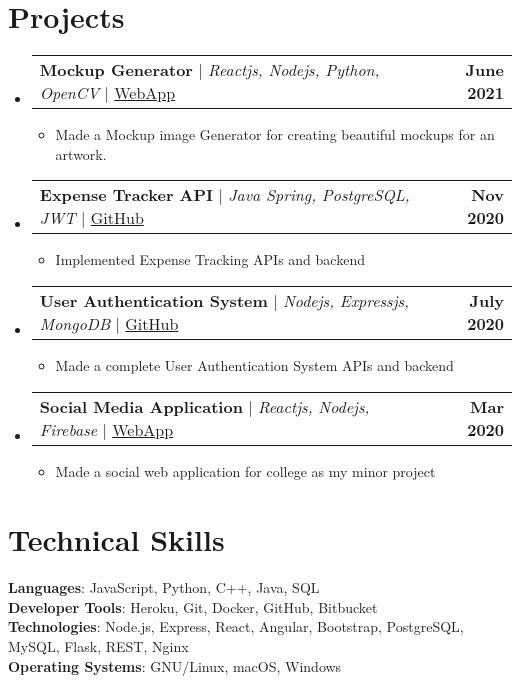 \documentclass[letterpaper,11pt]{article}
\makeatletter
\newcommand{\resumeItem}[1]{
  \item\small{
    {#1 \vspace{-2pt}}
  }
}
\newcommand{\resumeProjectHeading}[2]{
    \item
    \begin{tabular*}{1.001\textwidth}{l@{\extracolsep{\fill}}r}
      \small#1 & \textbf{\small #2} \\
    \end{tabular*}\vspace{-7pt}
}
\newcommand{\resumeSubHeadingListStart}{\begin{itemize}[leftmargin=0.0in, label={}]}
\newcommand{\resumeSubHeadingListEnd}{\end{itemize}}
\newcommand{\resumeItemListStart}{\justify \begin{itemize}}
\newcommand{\resumeItemListEnd}{\end{itemize}\vspace{-5pt}}
\makeatother
\begin{document}
\section{Projects}
    \vspace{-5pt}
    \resumeSubHeadingListStart
        \resumeProjectHeading
            {\textbf{Mockup Generator} $|$ \emph{Reactjs, Nodejs, Python, OpenCV}  $|$ \href{http://mockupgenerator-12159.web.app}{WebApp}}{June 2021}
            \resumeItemListStart
                \resumeItem{Made a Mockup image Generator for creating beautiful mockups for an artwork.}
            \resumeItemListEnd
        \resumeProjectHeading
            {\textbf{Expense Tracker API} $|$ \emph{Java Spring, PostgreSQL, JWT} $|$ \href{https://github.com/owais1412/expense-tracker-api}{GitHub}}{Nov 2020}
            \resumeItemListStart
                \resumeItem{Implemented Expense Tracking APIs and backend}
            \resumeItemListEnd
        \resumeProjectHeading
            {\textbf{User Authentication System} $|$ \emph{Nodejs, Expressjs, MongoDB} $|$ \href{https://github.com/owais1412/Node-User-Auth}{GitHub}}{July 2020}
            \resumeItemListStart
                \resumeItem{Made a complete User Authentication System APIs and backend}
            \resumeItemListEnd
        \resumeProjectHeading
            {\textbf{Social Media Application} $|$ \emph{Reactjs, Nodejs, Firebase} $|$ \href{https://svcesocialspace.web.app/login}{WebApp}}{Mar 2020}
            \resumeItemListStart
                \resumeItem{Made a social web application for college as my minor project}
            \resumeItemListEnd
    \resumeSubHeadingListEnd


%
\section{Technical Skills}
 \begin{itemize}[leftmargin=0.15in, label={}]
    {\item{
     \textbf{Languages}{: JavaScript, Python, C++, Java, SQL} \\
     \vspace{1pt}
     \textbf{Developer Tools}{: Heroku, Git, Docker, GitHub, Bitbucket} \\
     \vspace{1pt}
     \textbf{Technologies}{: Node.js, Express, React, Angular, Bootstrap, PostgreSQL, MySQL, Flask, REST, Nginx} \\
     \vspace{1pt}
     \textbf{Operating Systems}{: GNU/Linux, macOS, Windows} \\
    }}
 \end{itemize}
 \vspace{-16pt}
\end{document}
